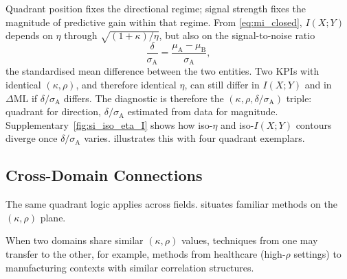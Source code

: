 Quadrant position fixes the directional regime; signal strength fixes the magnitude of predictive gain within that regime. From \cref{eq:mi_closed}, $I(X;Y)$ depends on $\eta$ through $\sqrt{(1+\kappa)/\eta}$, but also on the signal-to-noise ratio
\begin{equation}
  \frac{\delta}{\sigma_{\mathrm{A}}} = \frac{\mu_{\mathrm{A}} - \mu_{\mathrm{B}}}{\sigma_{\mathrm{A}}},
  \label{eq:delta_ratio}
\end{equation}
the standardised mean difference between the two entities. Two KPIs with identical $(\kappa,\rho)$, and therefore identical $\eta$, can still differ in $I(X;Y)$ and in $\Delta\mathrm{ML}$ if $\delta/\sigma_{\mathrm{A}}$ differs. The diagnostic is therefore the $(\kappa,\rho,\delta/\sigma_{\mathrm{A}})$ triple: quadrant for direction, $\delta/\sigma_{\mathrm{A}}$ estimated from data for magnitude. Supplementary~\cref{fig:si_iso_eta_I} shows how iso-$\eta$ and iso-$I(X;Y)$ contours diverge once $\delta/\sigma_{\mathrm{A}}$ varies.  illustrates this with four quadrant exemplars.

\subsection{Cross-Domain Connections}

The same quadrant logic applies across fields.  situates familiar methods on the $(\kappa,\rho)$ plane.

\begin{table}[t]
  \centering
  \caption{Cross-domain mapping of familiar methods to typical PEF regimes.}
  \label{tab:cross_domain}
\end{table}
When two domains share similar $(\kappa,\rho)$ values, techniques from one may transfer to the other, for example, methods from healthcare (high-$\rho$ settings) to manufacturing contexts with similar correlation structures.
